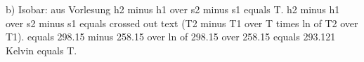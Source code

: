 b) Isobar: aus Vorlesung
h2 minus h1 over s2 minus s1 equals T.
h2 minus h1 over s2 minus s1 equals crossed out text (T2 minus T1 over T times ln of T2 over T1).
equals 298.15 minus 258.15 over ln of 298.15 over 258.15 equals 293.121 Kelvin equals T.